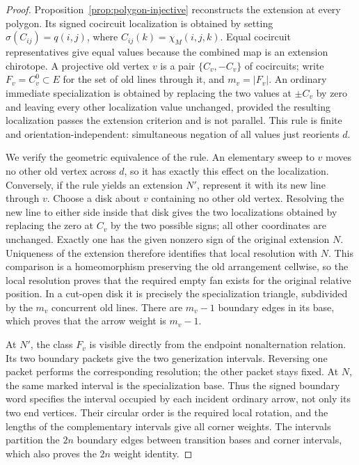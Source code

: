 \begin{proof}

Proposition~\ref{prop:polygon-injective} reconstructs the extension at every polygon.  Its signed
cocircuit localization is obtained by setting
$\sigma(C_{ij})=q(i,j)$, where $C_{ij}(k)=\chi_M(i,j,k)$.
Equal cocircuit representatives give equal values because the
combined map is an extension chirotope.  A projective old vertex
$v$ is a pair $\{C_v,-C_v\}$ of cocircuits; write
$F_v=C_v^0\subset E$ for the set of old lines through it, and
$m_v=|F_v|$.  An ordinary immediate specialization is obtained by
replacing the two values at $\pm C_v$ by zero and leaving every other
localization value unchanged, provided the resulting localization
passes the extension criterion and is not parallel.  This rule
is finite and orientation-independent: simultaneous negation of all
values just reorients $d$.

We verify the geometric equivalence of the rule.  An elementary sweep
to $v$ moves no other old vertex across $d$, so it has exactly this
effect on the localization.  Conversely, if the rule yields an
extension $N'$, represent it with its new line through $v$.  Choose a
disk about $v$ containing no other old vertex.  Resolving the new line
to either side inside that disk gives the two localizations obtained
by replacing the zero at $C_v$ by the two possible signs; all other
coordinates are unchanged.  Exactly one has the given nonzero sign
of the original extension $N$.  Uniqueness of the extension therefore
identifies that local resolution with $N$.  This comparison is a
homeomorphism preserving the old arrangement cellwise, so the local
resolution proves that the required empty fan exists for the original
relative position.  In a cut-open disk it is precisely the
specialization triangle, subdivided by the $m_v$ concurrent old
lines.  There are $m_v-1$ boundary edges in its base, which proves
that the arrow weight is $m_v-1$.

At $N'$, the class $F_v$ is visible directly from the endpoint
nonalternation relation.  Its two boundary packets give the two
generization intervals.  Reversing one packet performs the
corresponding resolution; the other packet stays fixed.  At $N$, the
same marked interval is the specialization base.  Thus the signed
boundary word specifies the interval occupied by each incident
ordinary arrow, not only its two end vertices.  Their circular order
is the required local rotation, and the lengths of the complementary
intervals give all corner weights.  The intervals partition the
$2n$ boundary edges between transition bases and corner intervals,
which also proves the $2n$ weight identity.


\end{proof}
